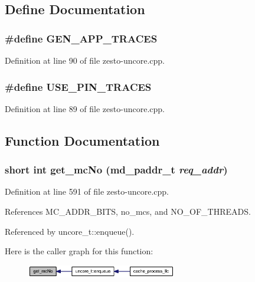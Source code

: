 \subsection{Define Documentation}
\subsubsection[{GEN\_\-APP\_\-TRACES}]{\setlength{\rightskip}{0pt plus 5cm}\#define GEN\_\-APP\_\-TRACES}\label{zesto-uncore_8cpp_994e221525e6fd9c7f6efa9974888e8e}




Definition at line 90 of file zesto-uncore.cpp.
\subsubsection[{USE\_\-PIN\_\-TRACES}]{\setlength{\rightskip}{0pt plus 5cm}\#define USE\_\-PIN\_\-TRACES}\label{zesto-uncore_8cpp_3ad9043475baaed1a4a792d3b563c60d}




Definition at line 89 of file zesto-uncore.cpp.

\subsection{Function Documentation}
\subsubsection[{get\_\-mcNo}]{\setlength{\rightskip}{0pt plus 5cm}short int get\_\-mcNo ({\bf md\_\-paddr\_\-t} {\em req\_\-addr})}\label{zesto-uncore_8cpp_29be9784ed7c6ed7c09f7dd9a505ebaf}




Definition at line 591 of file zesto-uncore.cpp.

References MC\_\-ADDR\_\-BITS, no\_\-mcs, and NO\_\-OF\_\-THREADS.

Referenced by uncore\_\-t::enqueue().

Here is the caller graph for this function:\nopagebreak
\begin{figure}[H]
\begin{center}
\leavevmode
\includegraphics[width=185pt]{zesto-uncore_8cpp_29be9784ed7c6ed7c09f7dd9a505ebaf_icgraph}
\end{center}
\end{figure}
